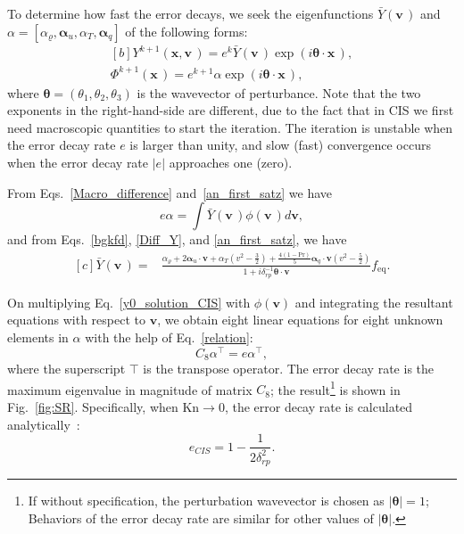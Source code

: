
To determine how fast the error decays, we seek the eigenfunctions $\bar{Y}(\bm{v}\,)$ and $\alpha=[\alpha_\varrho,\bm\alpha_{u},  \alpha_{T},\bm\alpha_{q}]$ of the following forms:
\begin{equation}\label{an_first_satz}
\begin{aligned}[b]
Y^{k+1}(\bm{x},\bm{v}\,)=e^{k}\bar{Y}(\bm{v}\,)\exp(i\bm{\theta}\cdot{\bm{x}}\,),\\
\Phi^{k+1}(\bm{x}\,)=e^{k+1}\alpha\exp(i\bm{\theta}\cdot{\bm{x}}\,),
\end{aligned}
\end{equation}
where  $\bm{\theta}=(\theta_1,\theta_2,\theta_3)$ is the wavevector of perturbance. Note that the two exponents in the right-hand-side are different, due to the fact that in CIS we first need macroscopic quantities to start the iteration. 
The iteration is unstable when the error decay rate $e$ is larger than unity, and slow (fast) convergence occurs when the error decay rate $|e|$ approaches one (zero). %

From Eqs.~\eqref{Macro_difference} and~\eqref{an_first_satz} we have 
\begin{equation}\label{relation}
e\alpha=\int \bar{Y}(\bm{v}\,)\phi(\bm{v}\,)d\bm{v},
\end{equation}
and from Eqs.~\eqref{bgkfd}, \eqref{Diff_Y}, and \eqref{an_first_satz}, we have
\begin{equation}\label{y0_solution_CIS}
\begin{aligned}[c]
\bar{Y}(\bm{v}\,)=&\frac{ \alpha_\varrho+2\bm\alpha_{u}\cdot\bm{v}+\alpha_T\left(v^2-\frac{3}{2}\right)+\frac{4(1-\text{Pr})}{5}\bm\alpha_{q}\cdot\bm{v}\left({v}^2-\frac{5}{2}\right) }{ 1+i{\delta^{-1}_{rp}}\bm{\theta}\cdot\bm{v} } {f_\text{eq}}.
\end{aligned}
\end{equation}

On multiplying Eq.~\eqref{y0_solution_CIS} with $\phi(\bm{v})$ and integrating the resultant equations with respect to $\bm{v}$, we obtain eight linear equations for eight unknown elements in $\alpha$ with the help of Eq.~\eqref{relation}:
\begin{equation}
C_8\alpha^\top=e\alpha^\top, 
\end{equation} 
where the superscript $\top$ is the transpose operator. The error decay rate is the maximum eigenvalue in magnitude of matrix $C_8$; the result\footnote{If without specification, the perturbation wavevector is chosen as $|\bm\theta|=1$; Behaviors of the error decay rate are similar for other values of $|\bm\theta|$.} is shown in Fig.~\ref{fig:SR}. Specifically, when $\text{Kn}\rightarrow0$, the error decay rate is calculated analytically~\cite{Su2020SIAM}:
\begin{equation}\label{analytical_CIS}
e_{CIS}=1-\frac{1}{2\delta^2_{rp}}.
\end{equation}

